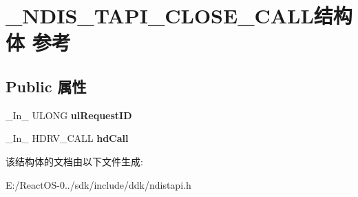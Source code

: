 \hypertarget{struct___n_d_i_s___t_a_p_i___c_l_o_s_e___c_a_l_l}{}\section{\+\_\+\+N\+D\+I\+S\+\_\+\+T\+A\+P\+I\+\_\+\+C\+L\+O\+S\+E\+\_\+\+C\+A\+L\+L结构体 参考}
\label{struct___n_d_i_s___t_a_p_i___c_l_o_s_e___c_a_l_l}
\subsection*{Public 属性}
\begin{DoxyCompactItemize}
\item 
\mbox{\label{struct___n_d_i_s___t_a_p_i___c_l_o_s_e___c_a_l_l_afac243d50e87607d1a3f54654fb50d65}} 
\+\_\+\+In\+\_\+ U\+L\+O\+NG {\bfseries ul\+Request\+ID}
\item 
\mbox{\label{struct___n_d_i_s___t_a_p_i___c_l_o_s_e___c_a_l_l_af94d48270667cb85f31bc90cf9ff2d70}} 
\+\_\+\+In\+\_\+ H\+D\+R\+V\+\_\+\+C\+A\+LL {\bfseries hd\+Call}
\end{DoxyCompactItemize}


该结构体的文档由以下文件生成\+:\begin{DoxyCompactItemize}
\item 
E\+:/\+React\+O\+S-\/0../sdk/include/ddk/ndistapi.\+h\end{DoxyCompactItemize}
